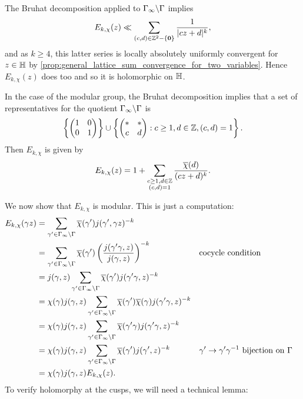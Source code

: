       The Bruhat decomposition applied to $\Gamma_{\infty}\backslash\Gamma$ implies
      \[
        E_{k,\chi}(z) \ll \sum_{(c,d) \in \mathbb{Z}^{2}-\{\mathbf{0}\}}\frac{1}{|cz+d|^{k}},
      \]
      and as $k \ge 4$, this latter series is locally absolutely uniformly convergent for $z \in \mathbb{H}$ by \cref{prop:general_lattice_sum_convergence_for_two_variables}. Hence $E_{k,\chi}(z)$ does too and so it is holomorphic on $\mathbb{H}$.

      \begin{remark}\label{rem:Eisenstein_series_on_modular_group}
        In the case of the modular group, the Bruhat decomposition implies that a set of representatives for the quotient $\Gamma_{\infty}\backslash\Gamma$ is
      \[
        \left\{\begin{pmatrix} 1 & 0 \\ 0 & 1 \end{pmatrix}\right\} \cup \left\{\begin{pmatrix} \ast & \ast \\ c & d \end{pmatrix}:c \ge 1, d \in \mathbb{Z}, (c,d) = 1\right\}.
      \]
      Then $E_{k,\chi}$ is given by
        \[
          E_{k,\chi}(z) = 1+\sum_{\substack{c \ge 1, d \in \mathbb{Z} \\ (c,d) = 1}}\frac{\overline{\chi}(d)}{(cz+d)^{k}}.
        \]
      \end{remark}

      We now show that $E_{k,\chi}$ is modular. This is just a computation:
      \begin{align*}
        E_{k,\chi}(\gamma z) &= \sum_{\gamma' \in \Gamma_{\infty}\backslash\Gamma}\overline{\chi}(\gamma')j(\gamma',\gamma z)^{-k} \\
        &= \sum_{\gamma' \in \Gamma_{\infty}\backslash\Gamma}\overline{\chi}(\gamma')\left(\frac{j(\gamma'\gamma,z)}{j(\gamma,z)}\right)^{-k} && \text{cocycle condition} \\
        &= j(\gamma,z)\sum_{\gamma' \in \Gamma_{\infty}\backslash\Gamma}\overline{\chi}(\gamma')j(\gamma'\gamma,z)^{-k} \\
        &= \chi(\gamma)j(\gamma,z)\sum_{\gamma' \in \Gamma_{\infty}\backslash\Gamma}\overline{\chi}(\gamma')\overline{\chi}(\gamma)j(\gamma'\gamma,z)^{-k} \\
        &= \chi(\gamma)j(\gamma,z)\sum_{\gamma' \in \Gamma_{\infty}\backslash\Gamma}\overline{\chi}(\gamma'\gamma)j(\gamma'\gamma,z)^{-k} \\
        &= \chi(\gamma)j(\gamma,z)\sum_{\gamma' \in \Gamma_{\infty}\backslash\Gamma}\overline{\chi}(\gamma')j(\gamma',z)^{-k} && \text{$\gamma' \to \gamma'\gamma^{-1}$ bijection on $\Gamma$} \\
        &= \chi(\gamma)j(\gamma,z)E_{k,\chi}(z).
      \end{align*}
      To verify holomorphy at the cusps, we will need a technical lemma:

